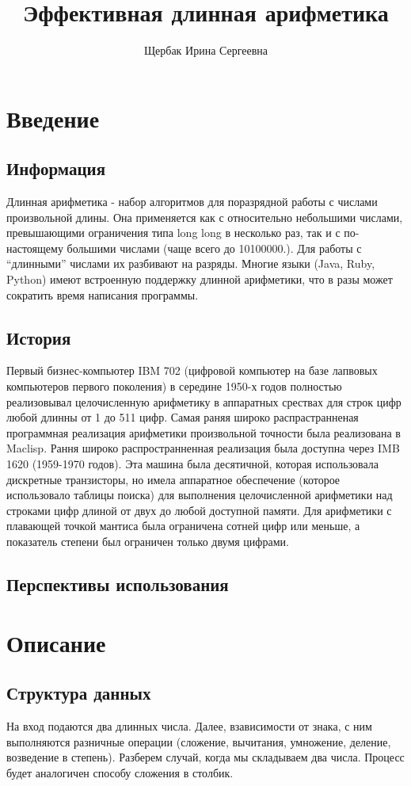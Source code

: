 \documentclass{article}
\title{Эффективная длинная арифметика}
\author{Щербак Ирина Сергеевна }
\begin{document}
\maketitle


\section{Введение}
\subsection{Информация}
Длинная арифметика - набор алгоритмов для поразрядной работы с числами произвольной длины. Она применяется как с относительно небольшими числами, превышающими ограничения типа long long в несколько раз, так и с по-настоящему большими числами (чаще всего до 10100000.). Для работы с “длинными” числами их разбивают на разряды.
Многие языки (Java, Ruby, Python) имеют встроенную поддержку длинной арифметики, что в разы может сократить время написания программы.
\subsection{История}
Первый бизнес-компьютер IBM 702 (цифровой компьютер на базе лапвовых компьютеров первого поколения) в середине 1950-х годов полностью реализовывал целочисленную арифметику в аппаратных срествах для строк цифр любой длинны от 1 до 511 цифр. Самая раняя широко распрастранненая программная реализация арифметики произвольной точности была реализована в Maclisp. 
Рання широко распространненная реализация была доступна через IMB 1620 (1959-1970 годов). Эта машина была десятичной, которая использовала дискретные транзисторы, но имела аппаратное обеспечение (которое использовало таблицы поиска) для выполнения целочисленной арифметики над строками цифр длиной от двух до любой доступной памяти. Для арифметики с плавающей точкой мантиса была ограничена сотней цифр или меньше, а показатель степени был ограничен только двумя цифрами. 
\subsection{Перспективы использования}

\section{Описание}
\subsection{Структура данных}
На вход подаются два длинных числа. Далее, взависимости от знака, с ним выполняются разничные операции (сложение, вычитания, умножение, деление, возведение в степень).
Разберем случай, когда мы складываем два числа. Процесс будет аналогичен способу сложения в столбик.
\end{document}
